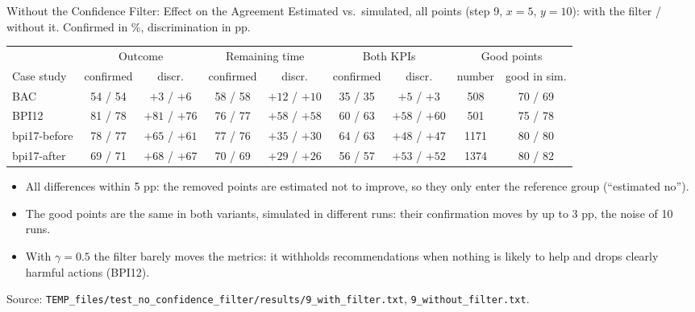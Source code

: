 \documentclass[aspectratio=169]{beamer} %
\begin{document}
\begin{frame}{Without the Confidence Filter: Effect on the Agreement}
  \footnotesize
  Estimated vs.\ simulated, all points (step 9, $x = 5$, $y = 10$): with the filter / without it.
  Confirmed in \%, discrimination in pp.
  \begin{center}\scriptsize\setlength{\tabcolsep}{2.5pt}
  \begin{tabular}{l cc cc cc cc}
    \toprule
     & \multicolumn{2}{c}{Outcome} & \multicolumn{2}{c}{Remaining time} & \multicolumn{2}{c}{Both KPIs}
     & \multicolumn{2}{c}{Good points} \\
    \cmidrule(lr){2-3}\cmidrule(lr){4-5}\cmidrule(lr){6-7}\cmidrule(lr){8-9}
    Case study & confirmed & discr. & confirmed & discr. & confirmed & discr. & number & good in sim. \\
    \midrule
    BAC          & 54 / 54 & $+3$ / $+6$   & 58 / 58 & $+12$ / $+10$ & 35 / 35 & $+5$ / $+3$   &  508 & 70 / 69 \\
    BPI12        & 81 / 78 & $+81$ / $+76$ & 76 / 77 & $+58$ / $+58$ & 60 / 63 & $+58$ / $+60$ &  501 & 75 / 78 \\
    bpi17-before & 78 / 77 & $+65$ / $+61$ & 77 / 76 & $+35$ / $+30$ & 64 / 63 & $+48$ / $+47$ & 1171 & 80 / 80 \\
    bpi17-after  & 69 / 71 & $+68$ / $+67$ & 70 / 69 & $+29$ / $+26$ & 56 / 57 & $+53$ / $+52$ & 1374 & 80 / 82 \\
    \bottomrule
  \end{tabular}
  \end{center}
  \scriptsize
  \begin{itemize}
    \item All differences within 5 pp: the removed points are estimated not to improve, so they only enter the
      reference group (``estimated no'').
    \item The good points are the same in both variants, simulated in different runs: their confirmation moves by
      up to 3 pp, the noise of 10 runs.
    \item With $\gamma = 0.5$ the filter barely moves the metrics: it withholds recommendations when nothing is
      likely to help and drops clearly harmful actions (BPI12).
  \end{itemize}
  {\scriptsize Source: \texttt{TEMP\_files/test\_no\_confidence\_filter/results/9\_with\_filter.txt},
  \texttt{9\_without\_filter.txt}.}
\end{frame}
\end{document}
